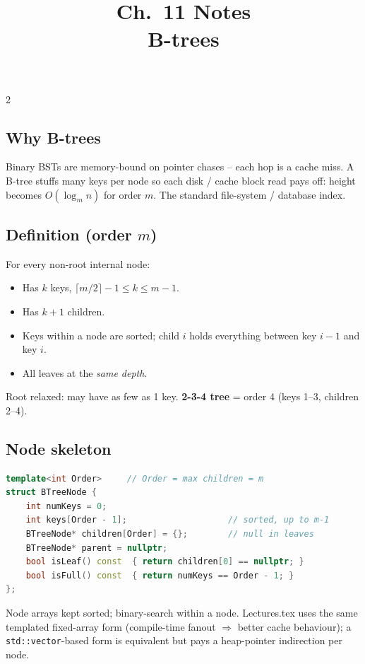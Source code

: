 \documentclass[10pt]{article}
\title{Ch.~11 Notes\\\large B-trees}
\author{}
\date{}
\begin{document}
\maketitle
\vspace{-2em}

\begin{multicols}{2}

\subsection*{Why B-trees}
Binary BSTs are memory-bound on pointer chases -- each hop is a
cache miss. A B-tree stuffs many keys per node so each disk / cache
block read pays off: height becomes $O(\log_m n)$ for order $m$.
The standard file-system / database index.

\subsection*{Definition (order $m$)}
For every non-root internal node:
\begin{itemize}
    \item Has $k$ keys, $\lceil m/2 \rceil - 1 \le k \le m - 1$.
    \item Has $k+1$ children.
    \item Keys within a node are sorted; child $i$ holds everything
    between key $i-1$ and key $i$.
    \item All leaves at the \emph{same depth}.
\end{itemize}
Root relaxed: may have as few as 1 key. \textbf{2-3-4 tree} = order 4
(keys 1--3, children 2--4).

\subsection*{Node skeleton}
\begin{lstlisting}[language=C++]
template<int Order>     // Order = max children = m
struct BTreeNode {
    int numKeys = 0;
    int keys[Order - 1];                    // sorted, up to m-1
    BTreeNode* children[Order] = {};        // null in leaves
    BTreeNode* parent = nullptr;
    bool isLeaf() const  { return children[0] == nullptr; }
    bool isFull() const  { return numKeys == Order - 1; }
};
\end{lstlisting}
Node arrays kept sorted; binary-search within a node. Lectures.tex
uses the same templated fixed-array form (compile-time fanout
$\Rightarrow$ better cache behaviour); a \texttt{std::vector}-based
form is equivalent but pays a heap-pointer indirection per node.


\end{multicols}
\end{document}
